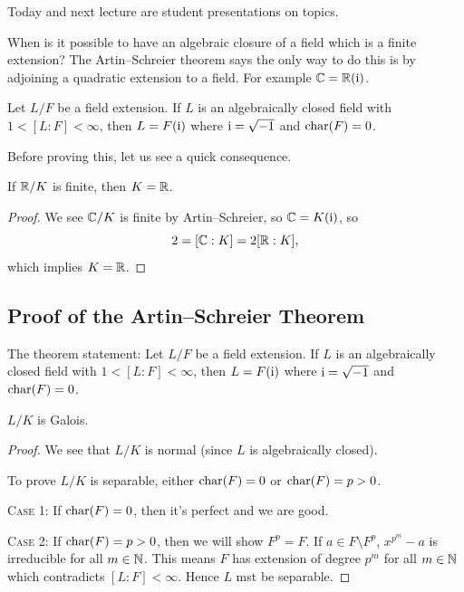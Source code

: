 

Today and next lecture are student presentations on topics.

\begin{node}
When is it possible to have an algebraic closure of a field which is a
finite extension? The Artin--Schreier theorem says the only way to do
this is by adjoining a quadratic extension to a field. For example
$\mathbb{C}=\mathbb{R}(\mathrm{i})$.
\end{node}

\begin{theorem}
Let $L/F$ be a field extension.
If $L$ is an algebraically closed field with $1<[L:F]<\infty$, then
$L=F(\mathrm{i})$ where $\mathrm{i}=\sqrt{-1}$ and $\operatorname{char}(F)=0$.
\end{theorem}

Before proving this, let us see a quick consequence.

\begin{corollary}
If $\mathbb{R}/K$ is finite, then $K=\mathbb{R}$.
\end{corollary}

\begin{proof}
We see $\mathbb{C}/K$ is finite by Artin--Schreier, so $\mathbb{C}=K(\mathrm{i})$, so
\begin{equation}
2=[\mathbb{C}:K]=2[\mathbb{R}:K],
\end{equation}
which implies $K=\mathbb{R}$.
\end{proof}

\subsection{Proof of the Artin--Schreier Theorem}

\begin{recall}
The theorem statement: Let $L/F$ be a field extension.
If $L$ is an algebraically closed field with $1<[L:F]<\infty$, then
$L=F(\mathrm{i})$ where $\mathrm{i}=\sqrt{-1}$ and $\operatorname{char}(F)=0$.
\end{recall}

\begin{claim}
$L/K$ is Galois.
\end{claim}

\begin{proof}
We see that $L/K$ is normal (since $L$ is algebraically closed).

To prove $L/K$ is separable, either $\operatorname{char}(F)=0$ or $\operatorname{char}(F)=p>0$.

\textsc{Case 1}: If $\operatorname{char}(F)=0$, then it's perfect and we are good.

\textsc{Case 2}: If $\operatorname{char}(F)=p>0$, then we will show $F^{p}=F$. If
$a\in F\setminus F^{p}$, $x^{p^{m}}-a$ is irreducible for all
$m\in\mathbb{N}$. This means $F$ has extension of degree $p^{m}$ for all
$m\in\mathbb{N}$ which contradicts $[L:F]<\infty$. Hence $L$ mst be separable.
\end{proof}


